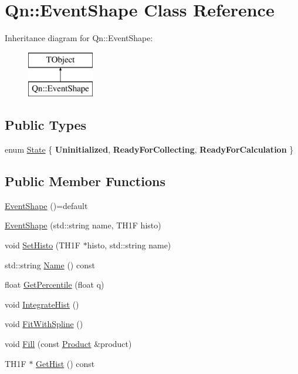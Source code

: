 \hypertarget{classQn_1_1EventShape}{}\section{Qn\+:\+:Event\+Shape Class Reference}
\label{classQn_1_1EventShape}
Inheritance diagram for Qn\+:\+:Event\+Shape\+:\begin{figure}[H]
\begin{center}
\leavevmode
\includegraphics[height=2.000000cm]{classQn_1_1EventShape}
\end{center}
\end{figure}
\subsection*{Public Types}
\begin{DoxyCompactItemize}
\item 
enum \mbox{\hyperlink{classQn_1_1EventShape_a5dce9f7b8a7fa7a8a663634ece8b7cb6}{State}} \{ {\bfseries Uninitialized}, 
{\bfseries Ready\+For\+Collecting}, 
{\bfseries Ready\+For\+Calculation}
 \}
\end{DoxyCompactItemize}
\subsection*{Public Member Functions}
\begin{DoxyCompactItemize}
\item 
\mbox{\hyperlink{classQn_1_1EventShape_ad24dc1e3b27a1a1b476d4e46f2374f9a}{Event\+Shape}} ()=default
\item 
\mbox{\hyperlink{classQn_1_1EventShape_ac275147afb48e3eeb997626b8f7eac43}{Event\+Shape}} (std\+::string name, T\+H1F histo)
\item 
void \mbox{\hyperlink{classQn_1_1EventShape_a306f3bb8d75c6feae8b5f633a724d73e}{Set\+Histo}} (T\+H1F $\ast$histo, std\+::string name)
\item 
std\+::string \mbox{\hyperlink{classQn_1_1EventShape_abc015406701863883722b6b848fa2ac0}{Name}} () const
\item 
float \mbox{\hyperlink{classQn_1_1EventShape_a05bdd3d71c99c4a4dc192cbd861198df}{Get\+Percentile}} (float q)
\item 
void \mbox{\hyperlink{classQn_1_1EventShape_ad00484e1a53ab0e3c56eafe7f199c67b}{Integrate\+Hist}} ()
\item 
void \mbox{\hyperlink{classQn_1_1EventShape_af2c3ca720b05814421f7293fadacc312}{Fit\+With\+Spline}} ()
\item 
void \mbox{\hyperlink{classQn_1_1EventShape_a7ef94151a36c2c7ab03e5771f216a5f6}{Fill}} (const \mbox{\hyperlink{structQn_1_1Product}{Product}} \&product)
\item 
T\+H1F $\ast$ \mbox{\hyperlink{classQn_1_1EventShape_abfcccc33d6d51fdac3f72ac4039a4ad1}{Get\+Hist}} () const
\end{DoxyCompactItemize}
